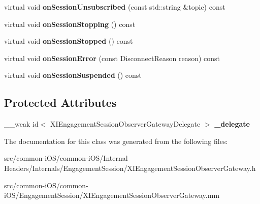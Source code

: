 \begin{DoxyCompactItemize}
virtual void {\bfseries on\+Session\+Unsubscribed} (const std\+::string \&topic) const
\item 
\hypertarget{class_x_i_engagement_session_observer_gateway_a77d4ea62e3c7fe98766c473000ac8cf3}{}\label{class_x_i_engagement_session_observer_gateway_a77d4ea62e3c7fe98766c473000ac8cf3} 
virtual void {\bfseries on\+Session\+Stopping} () const
\item 
\hypertarget{class_x_i_engagement_session_observer_gateway_a0378101fd291207060b9585326909d1e}{}\label{class_x_i_engagement_session_observer_gateway_a0378101fd291207060b9585326909d1e} 
virtual void {\bfseries on\+Session\+Stopped} () const
\item 
\hypertarget{class_x_i_engagement_session_observer_gateway_a76322dc4599502e8c871524f28ce2963}{}\label{class_x_i_engagement_session_observer_gateway_a76322dc4599502e8c871524f28ce2963} 
virtual void {\bfseries on\+Session\+Error} (const Disconnect\+Reason reason) const
\item 
\hypertarget{class_x_i_engagement_session_observer_gateway_a3d1fff8461255a056eb46fb2b0714eea}{}\label{class_x_i_engagement_session_observer_gateway_a3d1fff8461255a056eb46fb2b0714eea} 
virtual void {\bfseries on\+Session\+Suspended} () const
\end{DoxyCompactItemize}
\subsection*{Protected Attributes}
\begin{DoxyCompactItemize}
\item 
\hypertarget{class_x_i_engagement_session_observer_gateway_ac119f5eaa25c2bf61b778e7be943cd66}{}\label{class_x_i_engagement_session_observer_gateway_ac119f5eaa25c2bf61b778e7be943cd66} 
\+\_\+\+\_\+weak id$<$ X\+I\+Engagement\+Session\+Observer\+Gateway\+Delegate $>$ {\bfseries \+\_\+delegate}
\end{DoxyCompactItemize}


The documentation for this class was generated from the following files\+:\begin{DoxyCompactItemize}
\item 
src/common-\/i\+O\+S/common-\/i\+O\+S/\+Internal Headers/\+Internals/\+Engagement\+Session/X\+I\+Engagement\+Session\+Observer\+Gateway.\+h\item 
src/common-\/i\+O\+S/common-\/i\+O\+S/\+Engagement\+Session/X\+I\+Engagement\+Session\+Observer\+Gateway.\+mm\end{DoxyCompactItemize}
